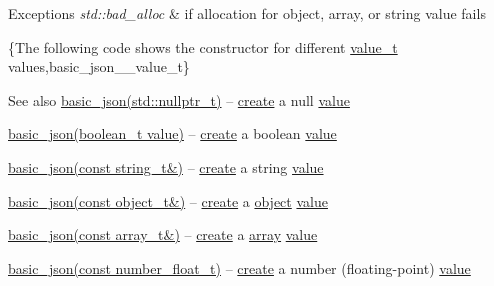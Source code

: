 \begin{DoxyExceptions}{Exceptions}
{\em std\+::bad\+\_\+alloc} & if allocation for object, array, or string value fails\\
\hline
\end{DoxyExceptions}
\{The following code shows the constructor for different \hyperlink{classnlohmann_1_1basic__json_a231b02148577b69a154b2ce2c87a5522}{value\+\_\+t} values,basic\+\_\+json\+\_\+\+\_\+value\+\_\+t\}

\begin{DoxySeeAlso}{See also}
\hyperlink{classnlohmann_1_1basic__json_aa7ad0ebda83e54c22ba8b3d954ef1293}{basic\+\_\+json(std\+::nullptr\+\_\+t)} -- \hyperlink{classnlohmann_1_1basic__json_a27df4303fbc83071275074486b54a40e}{create} a {\ttfamily null} \hyperlink{classnlohmann_1_1basic__json_a0a2cbbd95862a623e7dc5c37e67dead0}{value} 

\hyperlink{classnlohmann_1_1basic__json_aac36af84d907b5c3e469af889661620a}{basic\+\_\+json(boolean\+\_\+t value)} -- \hyperlink{classnlohmann_1_1basic__json_a27df4303fbc83071275074486b54a40e}{create} a boolean \hyperlink{classnlohmann_1_1basic__json_a0a2cbbd95862a623e7dc5c37e67dead0}{value} 

\hyperlink{classnlohmann_1_1basic__json_ab8b43d92a042dde96c28aeea81dd52de}{basic\+\_\+json(const string\+\_\+t\&)} -- \hyperlink{classnlohmann_1_1basic__json_a27df4303fbc83071275074486b54a40e}{create} a string \hyperlink{classnlohmann_1_1basic__json_a0a2cbbd95862a623e7dc5c37e67dead0}{value} 

\hyperlink{classnlohmann_1_1basic__json_a9af5ea68c88f423ddf35216aff7f1813}{basic\+\_\+json(const object\+\_\+t\&)} -- \hyperlink{classnlohmann_1_1basic__json_a27df4303fbc83071275074486b54a40e}{create} a \hyperlink{classnlohmann_1_1basic__json_ad25b2f8c21e241e2d63455537a9294ff}{object} \hyperlink{classnlohmann_1_1basic__json_a0a2cbbd95862a623e7dc5c37e67dead0}{value} 

\hyperlink{classnlohmann_1_1basic__json_a3aaf41d385f0d9a93deb92f9b14ae0cf}{basic\+\_\+json(const array\+\_\+t\&)} -- \hyperlink{classnlohmann_1_1basic__json_a27df4303fbc83071275074486b54a40e}{create} a \hyperlink{classnlohmann_1_1basic__json_a5685815624b086caa532f41e853d4b0f}{array} \hyperlink{classnlohmann_1_1basic__json_a0a2cbbd95862a623e7dc5c37e67dead0}{value} 

\hyperlink{classnlohmann_1_1basic__json_a2badcf191deabf579abcf8d3654da26f}{basic\+\_\+json(const number\+\_\+float\+\_\+t)} -- \hyperlink{classnlohmann_1_1basic__json_a27df4303fbc83071275074486b54a40e}{create} a number (floating-\/point) \hyperlink{classnlohmann_1_1basic__json_a0a2cbbd95862a623e7dc5c37e67dead0}{value} 


\end{DoxySeeAlso}
